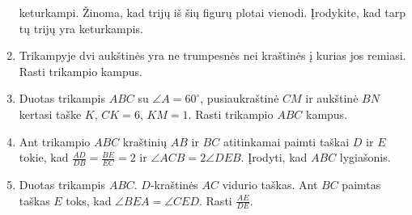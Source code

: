 \begin{enumerate}
  keturkampi. Žinoma, kad trijų iš šių figurų plotai vienodi. Įrodykite,
  kad tarp tų trijų yra keturkampis.
\item Trikampyje dvi aukštinės yra ne trumpesnės nei kraštinės į kurias jos
  remiasi. Rasti trikampio kampus. 
\item Duotas trikampis $ABC$ su $\angle A = 60^\circ$, pusiaukraštinė $CM$
  ir aukštinė $BN$ kertasi taške $K$, $CK=6$, $KM=1$. Rasti trikampio $ABC$
  kampus.
\item Ant trikampio $ABC$ kraštinių $AB$ ir $BC$ atitinkamai paimti taškai
  $D$ ir $E$ tokie, kad $\frac{AD}{DB} =\frac{BE}{EC}=2$ ir $\angle ACB
  =2\angle DEB$. Įrodyti, kad $ABC$ lygiašonis.
\item Duotas trikampis $ABC$. $D$-kraštinės $AC$ vidurio taškas. Ant $BC$
  paimtas taškas $E$ toks, kad $\angle BEA =\angle CED$. Rasti
  $\frac{AE}{DE}$.
\end{enumerate}


